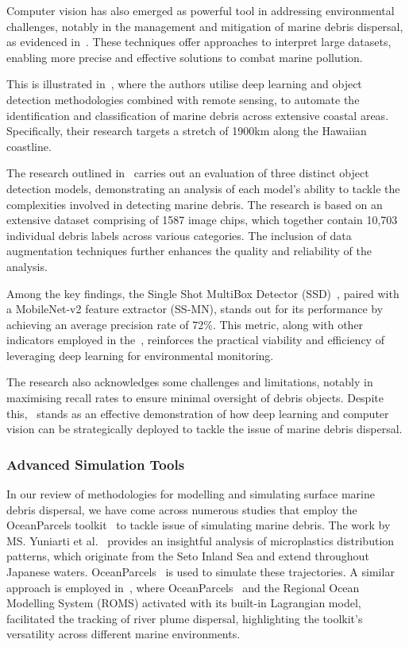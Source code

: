Computer vision has also emerged as powerful tool in addressing environmental challenges, notably in the management and mitigation of marine debris dispersal, as evidenced in~\cite{36}. These techniques offer approaches to interpret large datasets, enabling more precise and effective solutions to combat marine pollution.

This is illustrated in~\cite{36}, where the authors utilise deep learning and object detection methodologies combined with remote sensing, to automate the identification and classification of marine debris across extensive coastal areas. Specifically, their research targets a stretch of 1900km along the Hawaiian coastline.

The research outlined in~\cite{36} carries out an evaluation of three distinct object detection models, demonstrating an analysis of each model's ability to tackle the complexities involved in detecting marine debris. The research is based on an extensive dataset comprising of 1587 image chips, which together contain 10,703 individual debris labels across various categories. The inclusion of data augmentation techniques further enhances the quality and reliability of the analysis.

Among the key findings, the Single Shot MultiBox Detector (SSD)~\cite{39}, paired with a MobileNet-v2 feature extractor (SS-MN), stands out for its performance by achieving an average precision rate of 72\%. This metric, along with other indicators employed in the~\cite{36}, reinforces the practical viability and efficiency of leveraging deep learning for environmental monitoring. 

The research also acknowledges some challenges and limitations, notably in maximising recall rates to ensure minimal oversight of debris objects. Despite this,~\cite{36} stands as an effective demonstration of how deep learning and computer vision can be strategically deployed to tackle the issue of marine debris dispersal.

\subsubsection{Advanced Simulation Tools}
\label{subsubsec:2.2.1.3}

In our review of methodologies for modelling and simulating surface marine debris dispersal, we have come across numerous studies that employ the OceanParcels toolkit~\cite{20} to tackle issue of simulating marine debris. The work by MS. Yuniarti et al.~\cite{37} provides an insightful analysis of microplastics distribution patterns, which originate from the Seto Inland Sea and extend throughout Japanese waters. OceanParcels~\cite{20} is used to simulate these trajectories. A similar approach is employed in~\cite{38}, where OceanParcels~\cite{20} and the Regional Ocean Modelling System (ROMS) activated with its built-in Lagrangian model, facilitated the tracking of river plume dispersal, highlighting the toolkit's versatility across different marine environments.

